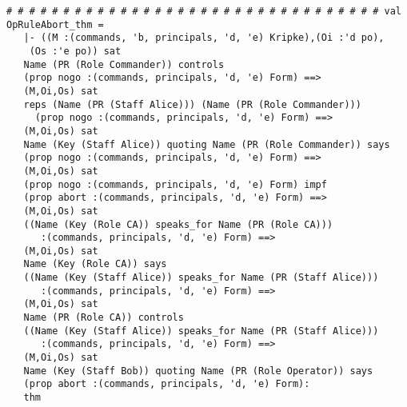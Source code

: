 \documentclass{report}
\begin{document}
\begin{session}
  \begin{scriptsize}
\begin{verbatim}
# # # # # # # # # # # # # # # # # # # # # # # # # # # # # # # # # val OpRuleAbort_thm =
   |- ((M :(commands, 'b, principals, 'd, 'e) Kripke),(Oi :'d po),
    (Os :'e po)) sat
   Name (PR (Role Commander)) controls
   (prop nogo :(commands, principals, 'd, 'e) Form) ==>
   (M,Oi,Os) sat
   reps (Name (PR (Staff Alice))) (Name (PR (Role Commander)))
     (prop nogo :(commands, principals, 'd, 'e) Form) ==>
   (M,Oi,Os) sat
   Name (Key (Staff Alice)) quoting Name (PR (Role Commander)) says
   (prop nogo :(commands, principals, 'd, 'e) Form) ==>
   (M,Oi,Os) sat
   (prop nogo :(commands, principals, 'd, 'e) Form) impf
   (prop abort :(commands, principals, 'd, 'e) Form) ==>
   (M,Oi,Os) sat
   ((Name (Key (Role CA)) speaks_for Name (PR (Role CA)))
      :(commands, principals, 'd, 'e) Form) ==>
   (M,Oi,Os) sat
   Name (Key (Role CA)) says
   ((Name (Key (Staff Alice)) speaks_for Name (PR (Staff Alice)))
      :(commands, principals, 'd, 'e) Form) ==>
   (M,Oi,Os) sat
   Name (PR (Role CA)) controls
   ((Name (Key (Staff Alice)) speaks_for Name (PR (Staff Alice)))
      :(commands, principals, 'd, 'e) Form) ==>
   (M,Oi,Os) sat
   Name (Key (Staff Bob)) quoting Name (PR (Role Operator)) says
   (prop abort :(commands, principals, 'd, 'e) Form):
   thm
\end{verbatim}
  \end{scriptsize}
\end{session}
\end{document}
